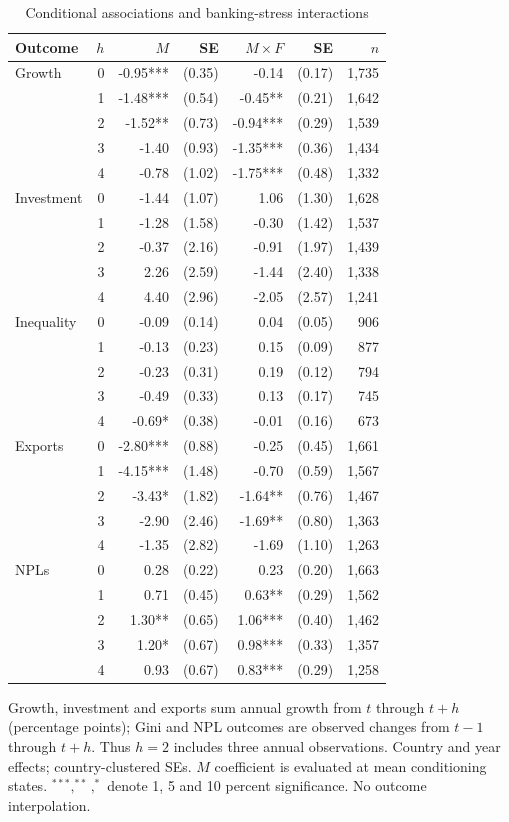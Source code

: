 \begin{table}[!htbp]
\centering\small
\caption{Conditional associations and banking-stress interactions}\label{tab:lp}
\begin{tabular}{lrrrrrr}\toprule
Outcome & $h$ & $M$ & SE & $M\times F$ & SE & $n$ \\
\midrule
Growth & 0 & -0.95*** & (0.35) & -0.14 & (0.17) & 1,735 \\
 & 1 & -1.48*** & (0.54) & -0.45** & (0.21) & 1,642 \\
 & 2 & -1.52** & (0.73) & -0.94*** & (0.29) & 1,539 \\
 & 3 & -1.40 & (0.93) & -1.35*** & (0.36) & 1,434 \\
 & 4 & -0.78 & (1.02) & -1.75*** & (0.48) & 1,332 \\
Investment & 0 & -1.44 & (1.07) & 1.06 & (1.30) & 1,628 \\
 & 1 & -1.28 & (1.58) & -0.30 & (1.42) & 1,537 \\
 & 2 & -0.37 & (2.16) & -0.91 & (1.97) & 1,439 \\
 & 3 & 2.26 & (2.59) & -1.44 & (2.40) & 1,338 \\
 & 4 & 4.40 & (2.96) & -2.05 & (2.57) & 1,241 \\
Inequality & 0 & -0.09 & (0.14) & 0.04 & (0.05) & 906 \\
 & 1 & -0.13 & (0.23) & 0.15 & (0.09) & 877 \\
 & 2 & -0.23 & (0.31) & 0.19 & (0.12) & 794 \\
 & 3 & -0.49 & (0.33) & 0.13 & (0.17) & 745 \\
 & 4 & -0.69* & (0.38) & -0.01 & (0.16) & 673 \\
Exports & 0 & -2.80*** & (0.88) & -0.25 & (0.45) & 1,661 \\
 & 1 & -4.15*** & (1.48) & -0.70 & (0.59) & 1,567 \\
 & 2 & -3.43* & (1.82) & -1.64** & (0.76) & 1,467 \\
 & 3 & -2.90 & (2.46) & -1.69** & (0.80) & 1,363 \\
 & 4 & -1.35 & (2.82) & -1.69 & (1.10) & 1,263 \\
NPLs & 0 & 0.28 & (0.22) & 0.23 & (0.20) & 1,663 \\
 & 1 & 0.71 & (0.45) & 0.63** & (0.29) & 1,562 \\
 & 2 & 1.30** & (0.65) & 1.06*** & (0.40) & 1,462 \\
 & 3 & 1.20* & (0.67) & 0.98*** & (0.33) & 1,357 \\
 & 4 & 0.93 & (0.67) & 0.83*** & (0.29) & 1,258 \\
\bottomrule\end{tabular}
\par\smallskip\begin{minipage}{0.98\linewidth}\footnotesize Growth, investment and exports sum annual growth from $t$ through $t+h$ (percentage points); Gini and NPL outcomes are observed changes from $t-1$ through $t+h$. Thus $h=2$ includes three annual observations. Country and year effects; country-clustered SEs. $M$ coefficient is evaluated at mean conditioning states. $^{***},^{**},^*$ denote 1, 5 and 10 percent significance. No outcome interpolation.\end{minipage}
\end{table}
